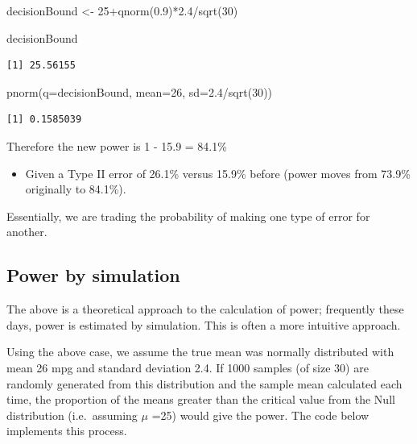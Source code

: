\documentclass[
  oneside]{krantz}
\newenvironment{Shaded}{\begin{snugshade}}{\end{snugshade}}
\newcommand{\AttributeTok}[1]{\textcolor[rgb]{0.77,0.63,0.00}{#1}}
\newcommand{\DecValTok}[1]{\textcolor[rgb]{0.00,0.00,0.81}{#1}}
\newcommand{\FloatTok}[1]{\textcolor[rgb]{0.00,0.00,0.81}{#1}}
\newcommand{\FunctionTok}[1]{\textcolor[rgb]{0.00,0.00,0.00}{#1}}
\newcommand{\NormalTok}[1]{#1}
\newcommand{\OtherTok}[1]{\textcolor[rgb]{0.56,0.35,0.01}{#1}}
\newcommand{\SpecialCharTok}[1]{\textcolor[rgb]{0.00,0.00,0.00}{#1}}
\providecommand{\tightlist}{%
  \setlength{\itemsep}{0pt}\setlength{\parskip}{0pt}}
\begin{document}
\begin{Shaded}
\begin{Highlighting}[]
\NormalTok{decisionBound }\OtherTok{\textless{}{-}} \DecValTok{25}\SpecialCharTok{+}\FunctionTok{qnorm}\NormalTok{(}\FloatTok{0.9}\NormalTok{)}\SpecialCharTok{*}\FloatTok{2.4}\SpecialCharTok{/}\FunctionTok{sqrt}\NormalTok{(}\DecValTok{30}\NormalTok{)}

\NormalTok{decisionBound}
\end{Highlighting}
\end{Shaded}

\begin{verbatim}
[1] 25.56155
\end{verbatim}

\begin{Shaded}
\begin{Highlighting}[]
\FunctionTok{pnorm}\NormalTok{(}\AttributeTok{q=}\NormalTok{decisionBound, }\AttributeTok{mean=}\DecValTok{26}\NormalTok{, }\AttributeTok{sd=}\FloatTok{2.4}\SpecialCharTok{/}\FunctionTok{sqrt}\NormalTok{(}\DecValTok{30}\NormalTok{))}
\end{Highlighting}
\end{Shaded}

\begin{verbatim}
[1] 0.1585039
\end{verbatim}

Therefore the new power is 1 - 15.9 = 84.1\%

\begin{itemize}
\tightlist
\item
  Given a Type II error of 26.1\% versus 15.9\% before (power moves from 73.9\% originally to 84.1\%).
\end{itemize}

Essentially, we are trading the probability of making one type of error for another.

\hypertarget{power-by-simulation}{%
\subsection{Power by simulation}\label{power-by-simulation}}

The above is a theoretical approach to the calculation of power; frequently these days, power is estimated by simulation. This is often a more intuitive approach.

Using the above case, we assume the true mean was normally distributed with mean 26 mpg and standard deviation 2.4. If 1000 samples (of size 30) are randomly generated from this distribution and the sample mean calculated each time, the proportion of the means greater than the critical value from the Null distribution (i.e.~assuming \(\mu\) =25) would give the power. The code below implements this process.
\end{document}
